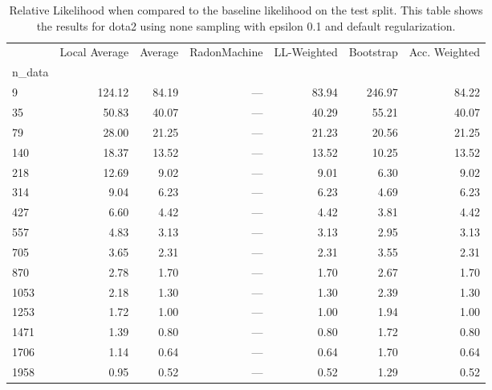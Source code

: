 \begin{table}
\centering
\caption{Relative Likelihood when compared to the baseline likelihood on the test split. This table shows the results for  dota2 using  none sampling with epsilon  0.1 and  default regularization.}
\label{tab:0}
\begin{tabular}{lrrrrrr}
\toprule
{} &  Local Average &  Average &  RadonMachine &  LL-Weighted &  Bootstrap &  Acc. Weighted \\
n\_data &                &          &               &              &            &                \\
\midrule
9      &         124.12 &    84.19 &           --- &        83.94 &     246.97 &          84.22 \\
35     &          50.83 &    40.07 &           --- &        40.29 &      55.21 &          40.07 \\
79     &          28.00 &    21.25 &           --- &        21.23 &      20.56 &          21.25 \\
140    &          18.37 &    13.52 &           --- &        13.52 &      10.25 &          13.52 \\
218    &          12.69 &     9.02 &           --- &         9.01 &       6.30 &           9.02 \\
314    &           9.04 &     6.23 &           --- &         6.23 &       4.69 &           6.23 \\
427    &           6.60 &     4.42 &           --- &         4.42 &       3.81 &           4.42 \\
557    &           4.83 &     3.13 &           --- &         3.13 &       2.95 &           3.13 \\
705    &           3.65 &     2.31 &           --- &         2.31 &       3.55 &           2.31 \\
870    &           2.78 &     1.70 &           --- &         1.70 &       2.67 &           1.70 \\
1053   &           2.18 &     1.30 &           --- &         1.30 &       2.39 &           1.30 \\
1253   &           1.72 &     1.00 &           --- &         1.00 &       1.94 &           1.00 \\
1471   &           1.39 &     0.80 &           --- &         0.80 &       1.72 &           0.80 \\
1706   &           1.14 &     0.64 &           --- &         0.64 &       1.70 &           0.64 \\
1958   &           0.95 &     0.52 &           --- &         0.52 &       1.29 &           0.52 \\
\bottomrule
\end{tabular}
\end{table}
